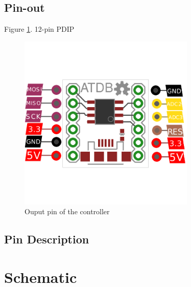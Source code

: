 \documentclass[11pt,onsided,a4paper]{article}
\begin{document}
\subsection{Pin-out}
Figure \ref{fig:pinout}. 12-pin PDIP

\begin{figure}[!h]
\centering 
\includegraphics[width=0.75\textwidth]{outline.png}
\caption{Ouput pin of the controller}
\label{fig:pinout}
\end{figure}

\subsection{Pin Description}\label{sec:pindesc}

\newpage
\section{Schematic}

\end{document}
